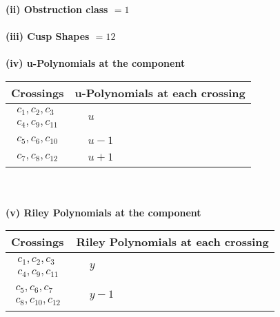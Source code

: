 \documentclass[1p]{elsarticle_modified}
\theoremstyle{definition}
\begin{document}
\flushleft \textbf{(ii) Obstruction class $= 1$}\\~\\
\flushleft \textbf{(iii) Cusp Shapes $= 12$}\\~\\
\newpage\renewcommand{\arraystretch}{1}
\flushleft \textbf{(iv) u-Polynomials at the component}\newline \\
\begin{tabular}{m{50pt}|m{274pt}}
Crossings & \hspace{64pt}u-Polynomials at each crossing \\
\hline $$\begin{aligned}c_{1},c_{2},c_{3}\\c_{4},c_{9},c_{11}\end{aligned}$$&$\begin{aligned}
&u
\end{aligned}$\\
\hline $$\begin{aligned}c_{5},c_{6},c_{10}\end{aligned}$$&$\begin{aligned}
&u-1
\end{aligned}$\\
\hline $$\begin{aligned}c_{7},c_{8},c_{12}\end{aligned}$$&$\begin{aligned}
&u+1
\end{aligned}$\\
\hline
\end{tabular}\\~\\
\newpage\renewcommand{\arraystretch}{1}
\flushleft \textbf{(v) Riley Polynomials at the component}\newline \\
\begin{tabular}{m{50pt}|m{274pt}}
Crossings & \hspace{64pt}Riley Polynomials at each crossing \\
\hline $$\begin{aligned}c_{1},c_{2},c_{3}\\c_{4},c_{9},c_{11}\end{aligned}$$&$\begin{aligned}
&y
\end{aligned}$\\
\hline $$\begin{aligned}c_{5},c_{6},c_{7}\\c_{8},c_{10},c_{12}\end{aligned}$$&$\begin{aligned}
&y-1
\end{aligned}$\\
\hline
\end{tabular}\\~\\
\end{document}
